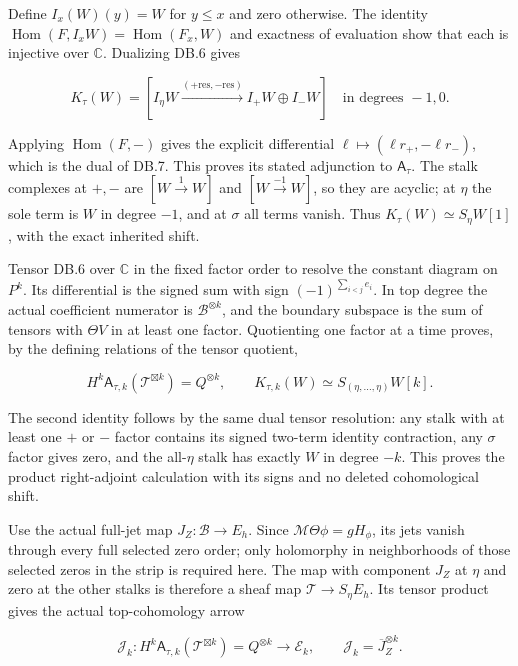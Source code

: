 Define \(I_x(W)(y)=W\) for \(y\le x\) and zero otherwise. The identity \(\operatorname{Hom}(F,I_xW)=\operatorname{Hom}(F_x,W)\) and exactness of evaluation show that each is injective over \(\mathbb C\). Dualizing DB.6 gives

\[
K_\tau(W)=
[I_\eta W\xrightarrow{(+\mathrm{res},-\mathrm{res})}
 I_+W\oplus I_-W]
\quad\text{in degrees }-1,0.
\tag{DB.8}
\]

Applying \(\operatorname{Hom}(F,-)\) gives the explicit differential \(\ell\mapsto(\ell r_+,-\ell r_-)\), which is the dual of DB.7. This proves its stated adjunction to \(\mathsf A_\tau\). The stalk complexes at \(+,-\) are \([W\xrightarrow{1}W]\) and \([W\xrightarrow{-1}W]\), so they are acyclic; at \(\eta\) the sole term is \(W\) in degree \(-1\), and at \(\sigma\) all terms vanish. Thus \(K_\tau(W)\simeq S_\eta W[1]\), with the exact inherited shift.

Tensor DB.6 over \(\mathbb C\) in the fixed factor order to resolve the constant diagram on \(P^k\). Its differential is the signed sum with sign \((-1)^{\sum_{i<j}e_i}\). In top degree the actual coefficient numerator is \(\mathscr B^{\otimes k}\), and the boundary subspace is the sum of tensors with \(\Theta V\) in at least one factor. Quotienting one factor at a time proves, by the defining relations of the tensor quotient,

\[
H^k\mathsf A_{\tau,k}(\mathcal T^{\boxtimes k})
=Q^{\otimes k},\qquad
K_{\tau,k}(W)\simeq S_{(\eta,\ldots,\eta)}W[k].
\tag{DB.9}
\]

The second identity follows by the same dual tensor resolution: any stalk with at least one \(+\) or \(-\) factor contains its signed two-term identity contraction, any \(\sigma\) factor gives zero, and the all-\(\eta\) stalk has exactly \(W\) in degree \(-k\). This proves the product right-adjoint calculation with its signs and no deleted cohomological shift.

Use the actual full-jet map \(J_Z:\mathscr B\to E_h\). Since \(\mathcal M\Theta\phi=gH_\phi\), its jets vanish through every full selected zero order; only holomorphy in neighborhoods of those selected zeros in the strip is required here. The map with component \(J_Z\) at \(\eta\) and zero at the other stalks is therefore a sheaf map \(\mathcal T\to S_\eta E_h\). Its tensor product gives the actual top-cohomology arrow

\[
\mathcal J_k:
H^k\mathsf A_{\tau,k}(\mathcal T^{\boxtimes k})=Q^{\otimes k}
\longrightarrow\mathcal E_k,
\qquad\mathcal J_k=\overline J_Z^{\otimes k}.
\tag{DB.10}
\]

